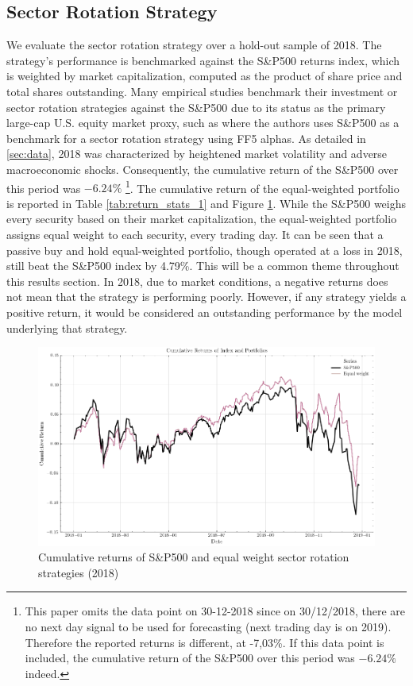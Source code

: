 \subsection{Sector Rotation Strategy}

We evaluate the sector rotation strategy over a hold-out sample of 2018. The strategy's performance is benchmarked against the S\&P500 returns index, which is weighted by market capitalization, computed as the product of share price and total shares outstanding. Many empirical studies benchmark their investment or sector rotation strategies against the S\&P500 due to its status as the primary large-cap U.S. equity market proxy, such as  where the authors uses S\&P500 as a benchmark for a sector rotation strategy using FF5 alphas. As detailed in \cref{sec:data}, 2018 was characterized by heightened market volatility and adverse macroeconomic shocks. Consequently, the cumulative return of the S\&P500 over this period was $-6.24\%$ \footnote{This paper omits the data point on 30-12-2018 since on 30/12/2018, there are no next day signal to be used for forecasting (next trading day is on 2019). Therefore the reported returns is different, at -7,03\%. If this data point is included, the cumulative return of the S\&P500 over this period was $-6.24\%$ indeed.}. The cumulative return of the equal-weighted portfolio is reported in Table \ref{tab:return_stats_1} and Figure \ref{fig:eq_w_cum_ret_plot}. While the S\&P500 weighs every security based on their market capitalization, the equal-weighted portfolio assigns equal weight to each security, every trading day. It can be seen that a passive buy and hold equal-weighted portfolio, though operated at a loss in 2018, still beat the S\&P500 index by 4.79\%. This will be a common theme throughout this results section. In 2018, due to market conditions, a negative returns does not mean that the strategy is performing poorly. However, if any strategy yields a positive return, it would be considered an outstanding performance by the model underlying that strategy.

\begin{figure}[H]
    \centering
    \includegraphics[width=\textwidth]{plots/results/equal_w_cum_ret_plot.png}
    \caption{Cumulative returns of S\&P500 and equal weight sector rotation strategies (2018)}\label{fig:eq_w_cum_ret_plot}
\end{figure}


